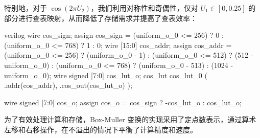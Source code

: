 特别地，对于 $\cos(2 \pi U_2)$，我们利用对称性和奇偶性，仅对 $U_1 \in [0, 0.25]$ 的部分进行查表映射，从而降低了存储需求并提高了查表效率：

\begin{codeblock}{verilog}
    wire cos_sign;
    assign cos_sign = (uniform_o_0 <= 256) ? 0 :
                      (uniform_o_0 <= 768) ? 1 :
                      0;
    wire [15:0] cos_addr;
    assign cos_addr = (uniform_o_0 <= 256) ? (uniform_o_0 - 1) :
                      (uniform_o_0 <= 512) ? (512 - uniform_o_0) :
                      (uniform_o_0 <= 768) ? (uniform_o_0 - 513) :
                      (1024 - uniform_o_0);
    wire signed [7:0] cos_lut_o;
    cos_lut cos_lut_0 (
        .addr(cos_addr),
        .cos_out(cos_lut_o)
    );

    wire signed [7:0] cos_o;
    assign cos_o = cos_sign ? -cos_lut_o : cos_lut_o;
\end{codeblock}

为了有效处理计算和存储，Box-Muller 变换的实现采用了定点数表示，通过算术左移和右移操作，在不溢出的情况下平衡了计算精度和速度。